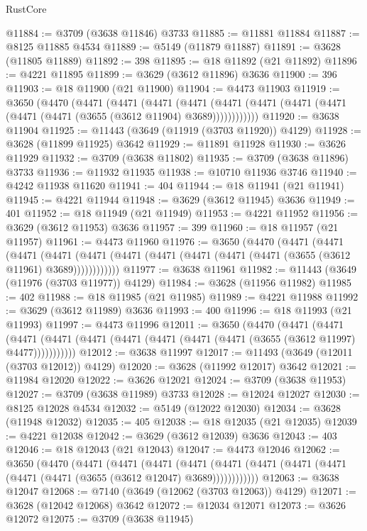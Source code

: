 \begin{lexlean}{RustCore}
\begin{coremodule}
@11884 := @3709 (@3638 @11846) @3733
@11885 := @11881 @11884
@11887 := @8125 @11885 @4534
@11889 := @5149 (@11879 @11887)
@11891 := @3628 (@11805 @11889)
@11892 := 398
@11895 := @18 @11892 (@21 @11892)
@11896 := @4221 @11895
@11899 := @3629 (@3612 @11896) @3636
@11900 := 396
@11903 := @18 @11900 (@21 @11900)
@11904 := @4473 @11903
@11919 := @3650
    (@4470
      (@4471
        (@4471
          (@4471
            (@4471 (@4471 (@4471 (@4471 (@4471 (@4471 (@4471 (@3655 (@3612 @11904) @3689))))))))))))
@11920 := @3638 @11904
@11925 := @11443 (@3649 (@11919 (@3703 @11920)) @4129)
@11928 := @3628 (@11899 @11925) @3642
@11929 := @11891 @11928
@11930 := @3626 @11929
@11932 := @3709 (@3638 @11802)
@11935 := @3709 (@3638 @11896) @3733
@11936 := @11932 @11935
@11938 := @10710 @11936 @3746
@11940 := @4242 @11938 @11620
@11941 := 404
@11944 := @18 @11941 (@21 @11941)
@11945 := @4221 @11944
@11948 := @3629 (@3612 @11945) @3636
@11949 := 401
@11952 := @18 @11949 (@21 @11949)
@11953 := @4221 @11952
@11956 := @3629 (@3612 @11953) @3636
@11957 := 399
@11960 := @18 @11957 (@21 @11957)
@11961 := @4473 @11960
@11976 := @3650
    (@4470
      (@4471
        (@4471
          (@4471
            (@4471 (@4471 (@4471 (@4471 (@4471 (@4471 (@4471 (@3655 (@3612 @11961) @3689))))))))))))
@11977 := @3638 @11961
@11982 := @11443 (@3649 (@11976 (@3703 @11977)) @4129)
@11984 := @3628 (@11956 @11982)
@11985 := 402
@11988 := @18 @11985 (@21 @11985)
@11989 := @4221 @11988
@11992 := @3629 (@3612 @11989) @3636
@11993 := 400
@11996 := @18 @11993 (@21 @11993)
@11997 := @4473 @11996
@12011 := @3650
    (@4470
      (@4471
        (@4471
          (@4471 (@4471 (@4471 (@4471 (@4471 (@4471 (@4471 (@3655 (@3612 @11997) @4477)))))))))))
@12012 := @3638 @11997
@12017 := @11493 (@3649 (@12011 (@3703 @12012)) @4129)
@12020 := @3628 (@11992 @12017) @3642
@12021 := @11984 @12020
@12022 := @3626 @12021
@12024 := @3709 (@3638 @11953)
@12027 := @3709 (@3638 @11989) @3733
@12028 := @12024 @12027
@12030 := @8125 @12028 @4534
@12032 := @5149 (@12022 @12030)
@12034 := @3628 (@11948 @12032)
@12035 := 405
@12038 := @18 @12035 (@21 @12035)
@12039 := @4221 @12038
@12042 := @3629 (@3612 @12039) @3636
@12043 := 403
@12046 := @18 @12043 (@21 @12043)
@12047 := @4473 @12046
@12062 := @3650
    (@4470
      (@4471
        (@4471
          (@4471
            (@4471 (@4471 (@4471 (@4471 (@4471 (@4471 (@4471 (@3655 (@3612 @12047) @3689))))))))))))
@12063 := @3638 @12047
@12068 := @7140 (@3649 (@12062 (@3703 @12063)) @4129)
@12071 := @3628 (@12042 @12068) @3642
@12072 := @12034 @12071
@12073 := @3626 @12072
@12075 := @3709 (@3638 @11945)

\end{coremodule}
\end{lexlean}
